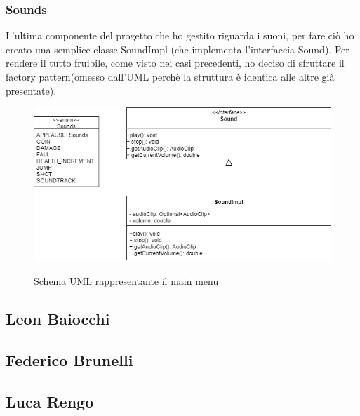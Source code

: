 \subsubsection{Sounds}
L'ultima componente del progetto che ho gestito riguarda i suoni, per fare ciò ho creato una semplice classe SoundImpl (che implementa l'interfaccia Sound). Per rendere il tutto fruibile, come visto nei casi precedenti, ho deciso di sfruttare il factory pattern(omesso dall'UML perchè la struttura è identica alle altre già presentate).

\begin{figure}[H]
	\centering{}
	\includegraphics[width=\textwidth]{img/Sounds.drawio}
	\label{img:Sounds.drawio.png}
	\caption{Schema UML rappresentante il main menu\\}
\end{figure}


\newpage

\subsection*{Leon Baiocchi}


\newpage

\subsection*{Federico Brunelli}


\newpage

\subsection*{Luca Rengo}


